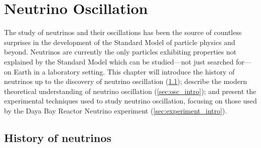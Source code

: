 \chapter{Neutrino Oscillation}
\label{ch:intro}

The study of neutrinos and their oscillations has been the source
of countless surprises in the development of the
Standard Model of particle physics and beyond.
Neutrinos are currently the only particles exhibiting properties
not explained by the Standard Model
which can be studied---not just searched for---on Earth in a laboratory setting.
This chapter will introduce the history of neutrinos
up to the discovery of neutrino oscillation (\cref{sec:history});
describe the modern theoretical understanding of neutrino oscillation
(\cref{sec:osc_intro});
and present the experimental techniques used to study neutrino oscillation,
focusing on those used by the Daya Bay Reactor Neutrino experiment (\cref{sec:experiment_intro}).

\section{History of neutrinos}
\label{sec:history}

